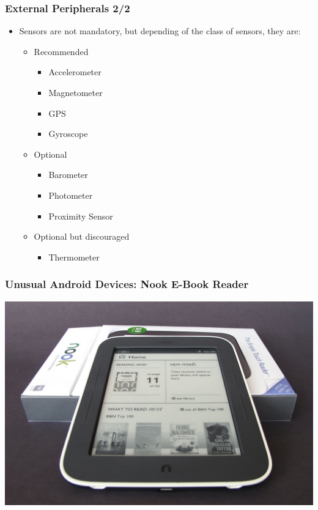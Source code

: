 \begin{frame}
  \frametitle{External Peripherals 2/2}
  \begin{itemize}
  \item Sensors are not mandatory, but depending of the class of
    sensors, they are:
    \begin{itemize}
    \item Recommended
      \begin{itemize}
      \item Accelerometer
      \item Magnetometer
      \item GPS
      \item Gyroscope
      \end{itemize}
    \item Optional
      \begin{itemize}
      \item Barometer
      \item Photometer
      \item Proximity Sensor
      \end{itemize}
    \item Optional but discouraged
      \begin{itemize}
      \item Thermometer
      \end{itemize}
    \end{itemize}
  \end{itemize}
\end{frame}

\begin{frame}
  \frametitle{Unusual Android Devices: Nook E-Book Reader}
  \begin{center}
    \includegraphics[width=\textwidth,height=0.7\textheight,keepaspectratio]{slides/android-introduction-hardware/nook.jpg}
  \end{center}
\end{frame}

